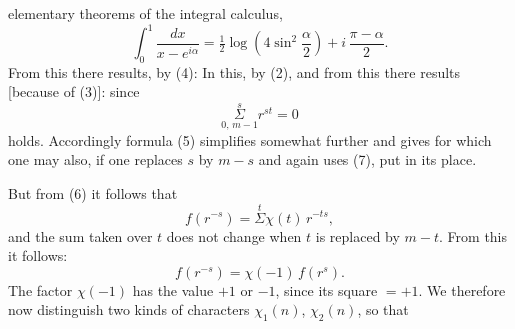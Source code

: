 elementary theorems of the integral calculus, 
\[
\int_0^1 \frac{dx}{x-e^{i\alpha}} = \tfrac{1}{2}\log\left(4\sin^2\frac{\alpha}{2}\right) + i\,\frac{\pi-\alpha}{2}.
\]
From this there results, by (4):
In this, by (2),
and from this there results [because of (3)]:
since
\[
\underset{0,\,m-1}{\overset{s}{\Sigma}} r^{st} = 0
\]
holds. Accordingly formula (5) simplifies somewhat further and gives
for which one may also, if one replaces $s$ by $m-s$ and again uses (7), put
in its place.

But from (6) it follows that
\[
f(r^{-s}) = \overset{t}{\Sigma}\chi(t)\,r^{-ts},
\]
and the sum taken over $t$ does not change when $t$ is replaced by $m-t$.
From this it follows:
\[
f(r^{-s}) = \chi(-1)\,f(r^s).
\]
The factor $\chi(-1)$ has the value $+1$ or $-1$, since its square $=+1$.
We therefore now distinguish two kinds of characters $\chi_1(n)$,
$\chi_2(n)$, so that
